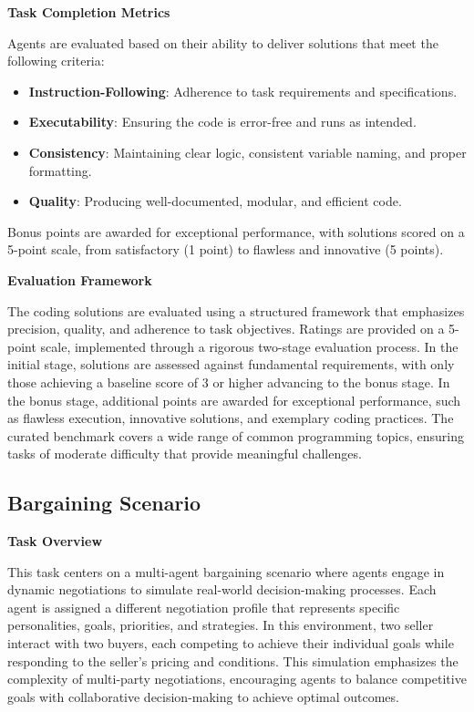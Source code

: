 \textbf{Task Completion Metrics}

Agents are evaluated based on their ability to deliver solutions that meet the following criteria:

\begin{itemize}
    \item \textbf{Instruction-Following}: Adherence to task requirements and specifications.
    \item \textbf{Executability}: Ensuring the code is error-free and runs as intended.
    \item \textbf{Consistency}: Maintaining clear logic, consistent variable naming, and proper formatting.
    \item \textbf{Quality}: Producing well-documented, modular, and efficient code.
\end{itemize}

Bonus points are awarded for exceptional performance, with solutions scored on a 5-point scale, from satisfactory (1 point) to flawless and innovative (5 points).

\textbf{Evaluation Framework}

The coding solutions are evaluated using a structured framework that emphasizes precision, quality, and adherence to task objectives. Ratings are provided on a 5-point scale, implemented through a rigorous two-stage evaluation process. In the initial stage, solutions are assessed against fundamental requirements, with only those achieving a baseline score of 3 or higher advancing to the bonus stage. In the bonus stage, additional points are awarded for exceptional performance, such as flawless execution, innovative solutions, and exemplary coding practices. The curated benchmark covers a wide range of common programming topics, ensuring tasks of moderate difficulty that provide meaningful challenges. 




\subsection{Bargaining Scenario}
\label{app:bargaining-scenario}
\textbf{Task Overview}

This task centers on a multi-agent bargaining scenario where agents engage in dynamic negotiations to simulate real-world decision-making processes. Each agent is assigned a different negotiation profile that represents specific personalities, goals, priorities, and strategies. In this environment, two seller interact with two buyers, each competing to achieve their individual goals while responding to the seller’s pricing and conditions. This simulation emphasizes the complexity of multi-party negotiations, encouraging agents to balance competitive goals with collaborative decision-making to achieve optimal outcomes.

